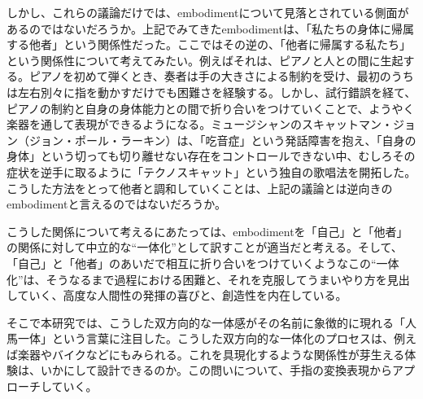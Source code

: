 
しかし、これらの議論だけでは、embodimentについて見落とされている側面があるのではないだろうか。上記でみてきたembodimentは、「私たちの身体に帰属する他者」という関係性だった。ここではその逆の、「他者に帰属する私たち」という関係性について考えてみたい。例えばそれは、ピアノと人との間に生起する。ピアノを初めて弾くとき、奏者は手の大きさによる制約を受け、最初のうちは左右別々に指を動かすだけでも困難さを経験する。しかし、試行錯誤を経て、ピアノの制約と自身の身体能力との間で折り合いをつけていくことで、ようやく楽器を通して表現ができるようになる。ミュージシャンのスキャットマン・ジョン（ジョン・ポール・ラーキン）は、「吃音症」という発話障害を抱え、「自身の身体」という切っても切り離せない存在をコントロールできない中、むしろその症状を逆手に取るように「テクノスキャット」という独自の歌唱法を開拓した。こうした方法をとって他者と調和していくことは、上記の議論とは逆向きのembodimentと言えるのではないだろうか。

こうした関係について考えるにあたっては、embodimentを「自己」と「他者」の関係に対して中立的な``一体化''として訳すことが適当だと考える。そして、「自己」と「他者」のあいだで相互に折り合いをつけていくようなこの``一体化''は、そうなるまで過程における困難と、それを克服してうまいやり方を見出していく、高度な人間性の発揮の喜びと、創造性を内在している。

そこで本研究では、こうした双方向的な一体感がその名前に象徴的に現れる「人馬一体」という言葉に注目した。こうした双方向的な一体化のプロセスは、例えば楽器やバイクなどにもみられる。これを具現化するような関係性が芽生える体験は、いかにして設計できるのか。この問いについて、手指の変換表現からアプローチしていく。



